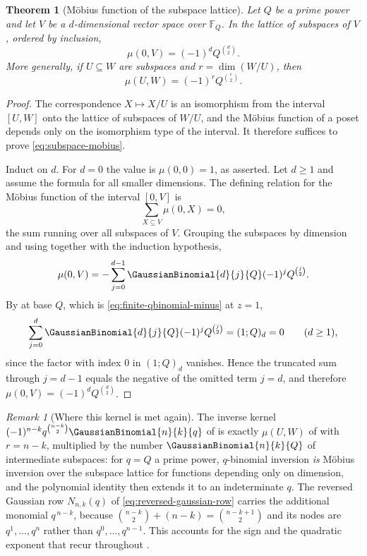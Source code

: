 \documentclass[11pt,a4paper,oneside,openany]{book}
\newtheorem{theorem}{Theorem}[chapter]
\theoremstyle{definition}
\theoremstyle{remark}
\newtheorem{remark}[remark]{Remark}
\newcommand{\F}{\mathbb F}
\begin{document}
\begin{theorem}[M\"obius function of the subspace lattice]\label{thm:subspace-mobius}
Let $Q$ be a prime power and let $V$ be a $d$-dimensional vector space over $\F_Q$.  In the lattice of subspaces of $V$, ordered by inclusion,
\begin{equation}\label{eq:subspace-mobius}
 \mu(0,V)=(-1)^dQ^{\binom d2}.
\end{equation}
More generally, if $U\subseteq W$ are subspaces and $r=\dim(W/U)$, then
\[
 \mu(U,W)=(-1)^rQ^{\binom r2}.
\]
\end{theorem}

\begin{proof}
The correspondence $X\mapsto X/U$ is an isomorphism from the interval $[U,W]$ onto the lattice of subspaces of $W/U$, and the M\"obius function of a poset depends only on the isomorphism type of the interval.  It therefore suffices to prove \eqref{eq:subspace-mobius}.

Induct on $d$.  For $d=0$ the value is $\mu(0,0)=1$, as asserted.  Let $d\ge1$ and assume the formula for all smaller dimensions.  The defining relation for the M\"obius function of the interval $[0,V]$ is
\[
 \sum_{X\subseteq V}\mu(0,X)=0,
\]
the sum running over all subspaces of $V$.  Grouping the subspaces by dimension and using  together with the induction hypothesis,
\[
 \mu(0,V)
 =-\sum_{j=0}^{d-1}\GaussianBinomial{d}{j}{Q}(-1)^jQ^{\binom j2}.
\]
By  at base $Q$, which is \eqref{eq:finite-qbinomial-minus} at $z=1$,
\[
 \sum_{j=0}^{d}\GaussianBinomial{d}{j}{Q}(-1)^jQ^{\binom j2}=(1;Q)_d=0
 \qquad(d\ge1),
\]
since the factor with index $0$ in $(1;Q)_d$ vanishes.  Hence the truncated sum through $j=d-1$ equals the negative of the omitted term $j=d$, and therefore
$\mu(0,V)=(-1)^dQ^{\binom d2}$.
\end{proof}

\begin{remark}[Where this kernel is met again]\label{rem:mobius-inversion-kernel}
The inverse kernel $(-1)^{n-k}q^{\binom{n-k}{2}}\GaussianBinomial{n}{k}{q}$ of  is exactly $\mu(U,W)$ of  with $r=n-k$, multiplied by the number $\GaussianBinomial{n}{k}{Q}$ of intermediate subspaces: for $q=Q$ a prime power, $q$-binomial inversion \emph{is} M\"obius inversion over the subspace lattice for functions depending only on dimension, and the polynomial identity then extends it to an indeterminate $q$.  The reversed Gaussian row $N_{n,k}(q)$ of \eqref{eq:reversed-gaussian-row} carries the additional monomial $q^{\,n-k}$, because
$\binom{n-k}{2}+(n-k)=\binom{n-k+1}{2}$ and its nodes are $q^1,\dots,q^n$ rather than $q^0,\dots,q^{n-1}$.  This accounts for the sign and the quadratic exponent that recur throughout .
\end{remark}
\end{document}
